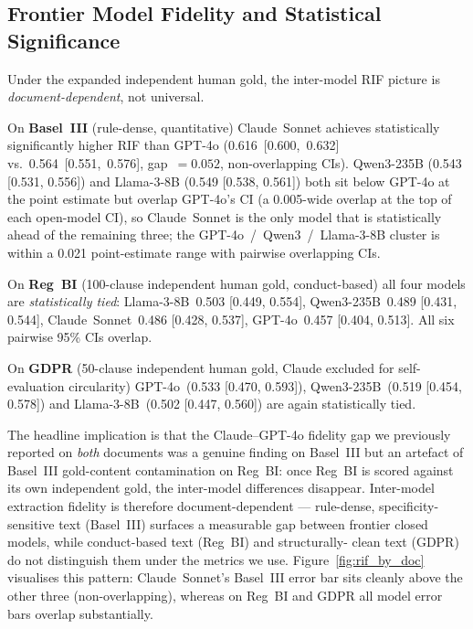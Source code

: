 \documentclass{article}
\begin{document}
\subsection{Frontier Model Fidelity and Statistical Significance}
\label{sec:discussion}

Under the expanded independent human gold, the inter-model RIF
picture is \emph{document-dependent}, not universal.

On \textbf{Basel~III} (rule-dense, quantitative) Claude~Sonnet
achieves statistically significantly higher RIF than GPT-4o
(0.616~[0.600,~0.632] vs.\ 0.564~[0.551,~0.576], gap~$=0.052$,
non-overlapping CIs). Qwen3-235B (0.543 [0.531, 0.556]) and
Llama-3-8B (0.549 [0.538, 0.561]) both sit below GPT-4o at the
point estimate but overlap GPT-4o's CI (a 0.005-wide overlap at
the top of each open-model CI), so Claude~Sonnet is the only model
that is statistically ahead of the remaining three; the
GPT-4o~/~Qwen3~/~Llama-3-8B cluster is within a 0.021 point-estimate
range with pairwise overlapping CIs.

On \textbf{Reg~BI} (100-clause independent human gold,
conduct-based) all four models are \emph{statistically tied}:
Llama-3-8B~0.503 [0.449, 0.554], Qwen3-235B~0.489 [0.431, 0.544],
Claude~Sonnet~0.486 [0.428, 0.537], GPT-4o~0.457 [0.404, 0.513].
All six pairwise 95\% CIs overlap.

On \textbf{GDPR} (50-clause independent human gold, Claude excluded
for self-evaluation circularity) GPT-4o~(0.533 [0.470, 0.593]),
Qwen3-235B~(0.519 [0.454, 0.578]) and Llama-3-8B~(0.502 [0.447, 0.560])
are again statistically tied.

The headline implication is that the Claude--GPT-4o fidelity gap we
previously reported on \textit{both} documents was a genuine finding
on Basel~III but an artefact of Basel~III gold-content contamination
on Reg~BI: once Reg~BI is scored against its own independent gold,
the inter-model differences disappear. Inter-model extraction
fidelity is therefore document-dependent --- rule-dense, specificity-
sensitive text (Basel~III) surfaces a measurable gap between frontier
closed models, while conduct-based text (Reg~BI) and structurally-
clean text (GDPR) do not distinguish them under the metrics we use.
Figure~\ref{fig:rif_by_doc} visualises this pattern: Claude~Sonnet's
Basel~III error bar sits cleanly above the other three
(non-overlapping), whereas on Reg~BI and GDPR all model error bars
overlap substantially.
\end{document}

